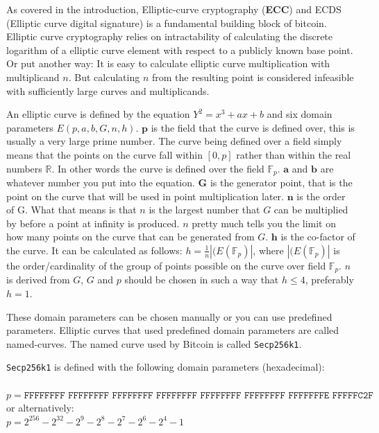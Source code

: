 
\label{ecdsa}
As covered in the introduction, Elliptic-curve cryptography (\textbf{ECC}) and ECDS (Elliptic curve digital signature) 
is a fundamental building block of bitcoin. Elliptic curve cryptography relies on 
intractability of calculating the discrete logarithm of a elliptic curve element with 
respect to a publicly known base point.\cite{miller_1986}\cite{nakamoto_bitcoin}\cite{antonopoulos_2017}\cite{ecc_def} Or put another way: It is easy to calculate 
elliptic curve multiplication with multiplicand $n$. But calculating $n$ from the 
resulting point is considered infeasible with sufficiently large curves and multiplicands.\cite{antonopoulos_2017}

An elliptic curve is defined by the equation $Y^2=x^3+ax+b$ and six domain parameters 
$E(p,a,b,G,n,h)$.\cite{Secp256k1_def}\cite{ecc_def} $\textbf{p}$ is the field that the curve is defined over, this 
is usually a very large prime number. The curve being defined over a field simply 
means that the points on the curve fall within $[0, p]$ rather than within the 
real numbers $\mathbb{R}$. In other words the curve is defined over the field 
$\mathbb{F}_{p}$. $\textbf{a}$ and $\textbf{b}$ are whatever number you put into 
the equation. $\textbf{G}$ is the generator point, that is the point on the curve 
that will be used in point multiplication later. $\textbf{n}$ is the order of G. What 
that means is that $n$ is the largest number that $G$ can be multiplied by before 
a point at infinity is produced. $n$ pretty much tells you the limit on how many points 
on the curve that can be generated from $G$. $\textbf{h}$ is the co-factor of the 
curve. It can be calculated as follows: $h=\frac{1}{n}|(E(\mathbb{F}_{p})|$, where 
$|(E(\mathbb{F}_{p})|$ is the order/cardinality of the group of points possible on 
the curve over field $\mathbb{F}_{p}$. $n$ is derived from $G$, $G$ and $p$ should 
be chosen in such a way that $h \leq 4$, preferably $h=1$.

These domain parameters can be chosen manually or you can use predefined parameters. 
Elliptic curves that used predefined domain parameters are called named-curves. 
The named curve used by Bitcoin is called \texttt{Secp256k1}.\cite{Secp256k1_def}\cite{antonopoulos_2017}\cite{nakamoto_bitcoin}

\texttt{Secp256k1} is defined with the following domain parameters (hexadecimal):\\\\
$p=\texttt{FFFFFFFF FFFFFFFF FFFFFFFF FFFFFFFF FFFFFFFF FFFFFFFF FFFFFFFE FFFFFC2F}$\\
or alternatively:\\
$p=2^{256}-2^{32}-2^{9}-2^{8}-2^{7}-2^{6}-2^{4}-1$

